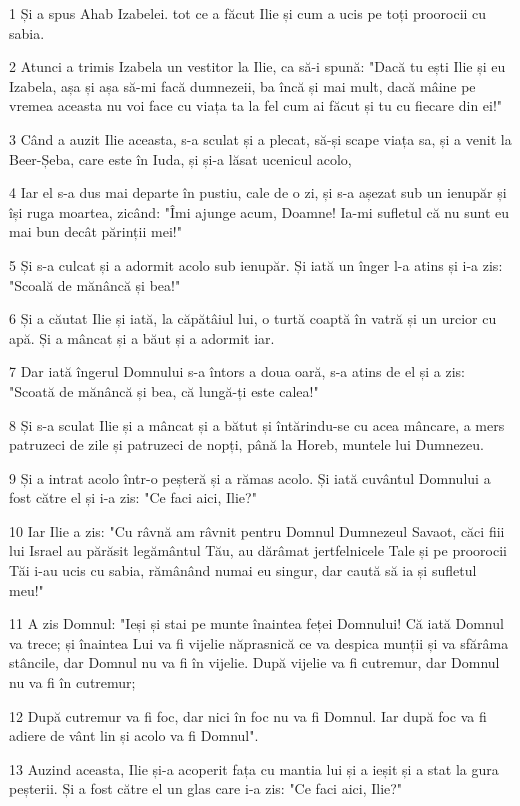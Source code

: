 \par 1 Și a spus Ahab Izabelei. tot ce a făcut Ilie și cum a ucis pe toți proorocii cu sabia.
\par 2 Atunci a trimis Izabela un vestitor la Ilie, ca să-i spună: "Dacă tu ești Ilie și eu Izabela, așa și așa să-mi facă dumnezeii, ba încă și mai mult, dacă mâine pe vremea aceasta nu voi face cu viața ta la fel cum ai făcut și tu cu fiecare din ei!"
\par 3 Când a auzit Ilie aceasta, s-a sculat și a plecat, să-și scape viața sa, și a venit la Beer-Șeba, care este în Iuda, și și-a lăsat ucenicul acolo,
\par 4 Iar el s-a dus mai departe în pustiu, cale de o zi, și s-a așezat sub un ienupăr și își ruga moartea, zicând: "Îmi ajunge acum, Doamne! Ia-mi sufletul că nu sunt eu mai bun decât părinții mei!"
\par 5 Și s-a culcat și a adormit acolo sub ienupăr. Și iată un înger l-a atins și i-a zis: "Scoală de mănâncă și bea!"
\par 6 Și a căutat Ilie și iată, la căpătâiul lui, o turtă coaptă în vatră și un urcior cu apă. Și a mâncat și a băut și a adormit iar.
\par 7 Dar iată îngerul Domnului s-a întors a doua oară, s-a atins de el și a zis: "Scoată de mănâncă și bea, că lungă-ți este calea!"
\par 8 Și s-a sculat Ilie și a mâncat și a bătut și întărindu-se cu acea mâncare, a mers patruzeci de zile și patruzeci de nopți, până la Horeb, muntele lui Dumnezeu.
\par 9 Și a intrat acolo într-o peșteră și a rămas acolo. Și iată cuvântul Domnului a fost către el și i-a zis: "Ce faci aici, Ilie?"
\par 10 Iar Ilie a zis: "Cu râvnă am râvnit pentru Domnul Dumnezeul Savaot, căci fiii lui Israel au părăsit legământul Tău, au dărâmat jertfelnicele Tale și pe proorocii Tăi i-au ucis cu sabia, rămânând numai eu singur, dar caută să ia și sufletul meu!"
\par 11 A zis Domnul: "Ieși și stai pe munte înaintea feței Domnului! Că iată Domnul va trece; și înaintea Lui va fi vijelie năprasnică ce va despica munții și va sfărâma stâncile, dar Domnul nu va fi în vijelie. După vijelie va fi cutremur, dar Domnul nu va fi în cutremur;
\par 12 După cutremur va fi foc, dar nici în foc nu va fi Domnul. Iar după foc va fi adiere de vânt lin și acolo va fi Domnul".
\par 13 Auzind aceasta, Ilie și-a acoperit fața cu mantia lui și a ieșit și a stat la gura peșterii. Și a fost către el un glas care i-a zis: "Ce faci aici, Ilie?"
